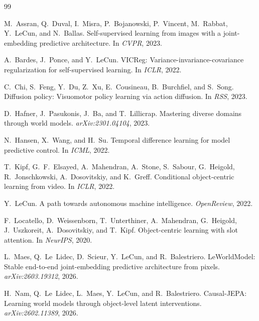 \documentclass[12pt]{article}
\begin{document}

\begin{thebibliography}{99}

M.~Assran, Q.~Duval, I.~Misra, P.~Bojanowski, P.~Vincent, M.~Rabbat, Y.~LeCun, and N.~Ballas.
\newblock Self-supervised learning from images with a joint-embedding predictive architecture.
\newblock In \textit{CVPR}, 2023.

A.~Bardes, J.~Ponce, and Y.~LeCun.
\newblock VICReg: Variance-invariance-covariance regularization for self-supervised learning.
\newblock In \textit{ICLR}, 2022.

C.~Chi, S.~Feng, Y.~Du, Z.~Xu, E.~Cousineau, B.~Burchfiel, and S.~Song.
\newblock Diffusion policy: Visuomotor policy learning via action diffusion.
\newblock In \textit{RSS}, 2023.

D.~Hafner, J.~Pasukonis, J.~Ba, and T.~Lillicrap.
\newblock Mastering diverse domains through world models.
\newblock \textit{arXiv:2301.04104}, 2023.

N.~Hansen, X.~Wang, and H.~Su.
\newblock Temporal difference learning for model predictive control.
\newblock In \textit{ICML}, 2022.

T.~Kipf, G.~F.~Elsayed, A.~Mahendran, A.~Stone, S.~Sabour, G.~Heigold, R.~Jonschkowski, A.~Dosovitskiy, and K.~Greff.
\newblock Conditional object-centric learning from video.
\newblock In \textit{ICLR}, 2022.

Y.~LeCun.
\newblock A path towards autonomous machine intelligence.
\newblock \textit{OpenReview}, 2022.

F.~Locatello, D.~Weissenborn, T.~Unterthiner, A.~Mahendran, G.~Heigold, J.~Uszkoreit, A.~Dosovitskiy, and T.~Kipf.
\newblock Object-centric learning with slot attention.
\newblock In \textit{NeurIPS}, 2020.

L.~Maes, Q.~Le~Lidec, D.~Scieur, Y.~LeCun, and R.~Balestriero.
\newblock LeWorldModel: Stable end-to-end joint-embedding predictive architecture from pixels.
\newblock \textit{arXiv:2603.19312}, 2026.

H.~Nam, Q.~Le~Lidec, L.~Maes, Y.~LeCun, and R.~Balestriero.
\newblock Causal-JEPA: Learning world models through object-level latent interventions.
\newblock \textit{arXiv:2602.11389}, 2026.


\end{thebibliography}
\end{document}
